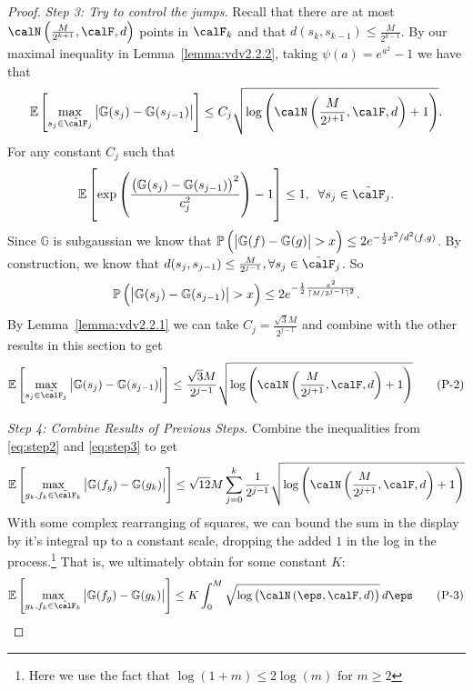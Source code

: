 \begin{proof}
	\emph{Step 3: Try to control the jumps.} Recall that there are at most \(\calN\left(\frac{M}{2^{k+1}},\calF,d \right)\) points in \(\calF_k\) and that \(d(s_k,s_{k-1})\leq \frac{M}{2^{k-1}}\). By our maximal inequality in Lemma~\ref{lemma:vdv2.2.2}, taking \(\psi(a) = e^{a^2}-1\) we have that 
	\[
		\E\left[\max_{s_j\in\tilde\calF_j}\left|\mathbb{G}(s_j)-\mathbb{G}(s_{j-1})\right|\right] \leq C_j \sqrt{\log\left( \calN\left(\frac{M}{2^{j+1}},\calF,d\right)+1\right)}
	.\]
	For any constant \(C_j\) such that
	 \[
		 \E\left[\exp\left(\frac{\left(\mathbb{G}(s_j)-\mathbb{G}(s_{j-1})\right)^2}{c_j^2} \right)-1\right]\leq 1,\;\; \forall s_j\in\tilde\calF_j
	.\] 
	Since \(\mathbb{G}\) is subgaussian we know that \(\P\left(\left|\mathbb{G}(f)-\mathbb{G}(g)\right|>x\right)\leq 2e^{-\frac{1}{2}x^2/d^2(f,g) }\). By construction, we know that \(d(s_j,s_{j-1})\leq \frac{M}{2^{j-1}},\forall s_j\in\tilde\calF_j \). So
	\[
		\P\left(\left|\mathbb{G}(s_j)-\mathbb{G}(s_{j-1})\right|>x\right)\leq 2e^{-\frac{1}{2}\frac{x^2}{\lceil M/2^{j-1}\rceil^2}}
	.\] 
	By Lemma~\ref{lemma:vdv2.2.1} we can take \(C_j = \frac{\sqrt{3}M}{2^{j-1}}\) and combine with the other results in this section to get
	\begin{equation}
	\label{eq:step3}
	\E\left[\max_{s_j\in\tilde\calF_j}\left|\mathbb{G}(s_j)-\mathbb{G}(s_{j-1})\right|\right]\leq \frac{\sqrt{3}M}{2^{j-1}}\sqrt{\log\left(\calN\left(\frac{M}{2^{j+1}},\calF,d\right)+1\right)} \tag{P-2}
	\end{equation}
	
	\emph{Step 4: Combine Results of Previous Steps.} Combine the inequalities from \eqref{eq:step2} and \eqref{eq:step3} to get
	\begin{equation*}
		\E\left[\max_{g_k,f_k\in\tilde\calF_k}\left|\mathbb{G}(f_g)-\mathbb{G}(g_k)\right|\right]\leq \sqrt{12}M\sum_{j=0}^k \frac{1}{2^{j-1}}\sqrt{\log\left(\calN\left(\frac{M}{2^{j+1}},\calF,d \right)+1\right)} 
	\end{equation*}
	With some complex rearranging of squares, we can bound the sum in the display by it's integral up to a constant scale, dropping the added \(1\) in the log in the process.\footnote{Here we use the fact that \(\log(1+m)\leq 2\log(m)\) for \(m\geq 2\)} That is, we ultimately obtain for some constant \(K\): 
	\begin{equation}
		\label{eq:step4}
		\E\left[\max_{g_k,f_k\in\tilde\calF_k}\left|\mathbb{G}(f_g)-\mathbb{G}(g_k)\right|\right]\leq K \int_{0}^{M}   \sqrt{\log\left(\calN\left(\eps,\calF,d \right)\right)}\, d\eps \tag{P-3}
	\end{equation}


\end{proof}
